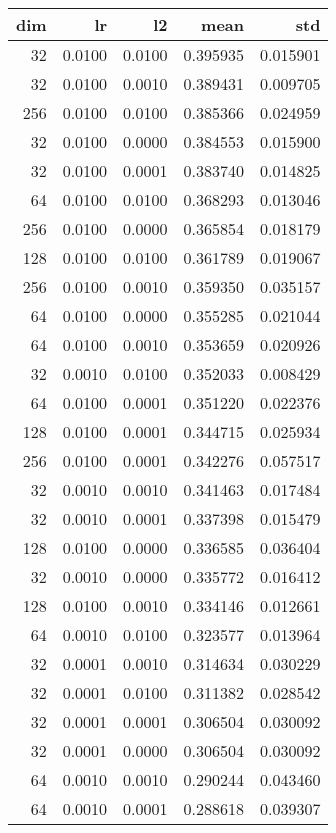 \begin{tabular}{rrrrr}
\toprule
 dim &      lr &      l2 &      mean &       std \\
\midrule
  32 &  0.0100 &  0.0100 &  0.395935 &  0.015901 \\
  32 &  0.0100 &  0.0010 &  0.389431 &  0.009705 \\
 256 &  0.0100 &  0.0100 &  0.385366 &  0.024959 \\
  32 &  0.0100 &  0.0000 &  0.384553 &  0.015900 \\
  32 &  0.0100 &  0.0001 &  0.383740 &  0.014825 \\
  64 &  0.0100 &  0.0100 &  0.368293 &  0.013046 \\
 256 &  0.0100 &  0.0000 &  0.365854 &  0.018179 \\
 128 &  0.0100 &  0.0100 &  0.361789 &  0.019067 \\
 256 &  0.0100 &  0.0010 &  0.359350 &  0.035157 \\
  64 &  0.0100 &  0.0000 &  0.355285 &  0.021044 \\
  64 &  0.0100 &  0.0010 &  0.353659 &  0.020926 \\
  32 &  0.0010 &  0.0100 &  0.352033 &  0.008429 \\
  64 &  0.0100 &  0.0001 &  0.351220 &  0.022376 \\
 128 &  0.0100 &  0.0001 &  0.344715 &  0.025934 \\
 256 &  0.0100 &  0.0001 &  0.342276 &  0.057517 \\
  32 &  0.0010 &  0.0010 &  0.341463 &  0.017484 \\
  32 &  0.0010 &  0.0001 &  0.337398 &  0.015479 \\
 128 &  0.0100 &  0.0000 &  0.336585 &  0.036404 \\
  32 &  0.0010 &  0.0000 &  0.335772 &  0.016412 \\
 128 &  0.0100 &  0.0010 &  0.334146 &  0.012661 \\
  64 &  0.0010 &  0.0100 &  0.323577 &  0.013964 \\
  32 &  0.0001 &  0.0010 &  0.314634 &  0.030229 \\
  32 &  0.0001 &  0.0100 &  0.311382 &  0.028542 \\
  32 &  0.0001 &  0.0001 &  0.306504 &  0.030092 \\
  32 &  0.0001 &  0.0000 &  0.306504 &  0.030092 \\
  64 &  0.0010 &  0.0010 &  0.290244 &  0.043460 \\
  64 &  0.0010 &  0.0001 &  0.288618 &  0.039307 \\

\end{tabular}
